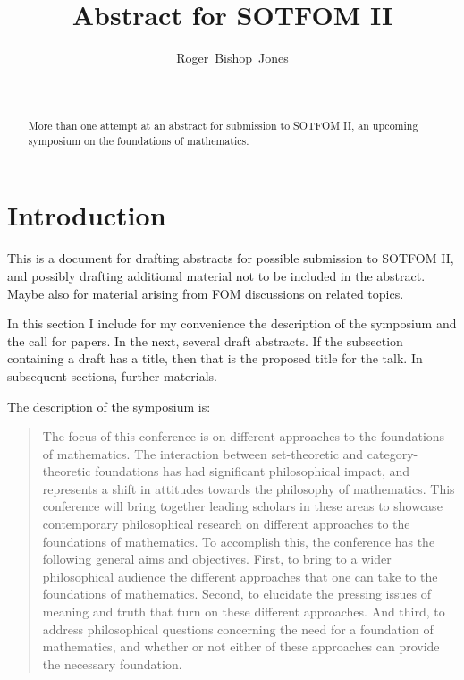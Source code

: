 \documentclass[10pt,titlepage]{article}
\title{Abstract for SOTFOM II}
\author{Roger~Bishop~Jones}
\date{\ }
\begin{document}
                               
\begin{titlepage}
\maketitle

\begin{abstract}
More than one attempt at an abstract for submission to SOTFOM II, an upcoming symposium on the foundations of mathematics.
\end{abstract}





\end{titlepage}

\setcounter{tocdepth}{2}
{\parskip-0pt\tableofcontents}



\section{Introduction}

This is a document for drafting abstracts for possible submission to SOTFOM II, and possibly drafting additional material not to be included in the abstract.
Maybe also for material arising from FOM discussions on related topics.

In this section I include for my convenience the description of the symposium and the call for papers.
In the next, several draft abstracts.
If the subsection containing a draft has a title, then that is the proposed title for the talk.
In subsequent sections, further materials.

The description of the symposium is:

\begin{quotation}
The focus of this conference is on different approaches to the foundations of mathematics. The interaction between set-theoretic and category-theoretic foundations has had significant philosophical impact, and represents a shift in attitudes towards the philosophy of mathematics. This conference will bring together leading scholars in these areas to showcase contemporary philosophical research on different approaches to the foundations of mathematics. To accomplish this, the conference has the following general aims and objectives. First, to bring to a wider philosophical audience the different approaches that one can take to the foundations of mathematics. Second, to elucidate the pressing issues of meaning and truth that turn on these different approaches. And third, to address philosophical questions concerning the need for a foundation of mathematics, and whether or not either of these approaches can provide the necessary foundation.
\end{quotation}
\end{document}
